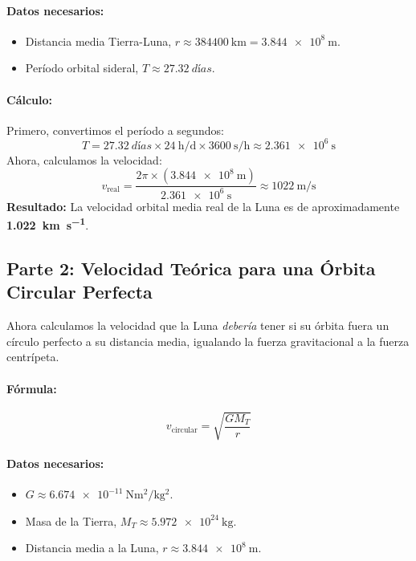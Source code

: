 \documentclass[11pt,a4paper]{book}
\begin{document}
\paragraph{Datos necesarios:}
\begin{itemize}
    \item Distancia media Tierra-Luna, $r \approx \SI{384400}{\kilo\meter} = \SI{3.844e8}{\meter}$.
    \item Período orbital sideral, $T \approx \SI{27.32}{días}$.
\end{itemize}

\paragraph{Cálculo:}
Primero, convertimos el período a segundos:
\[ T = \SI{27.32}{días} \times \SI{24}{\hour\per\day} \times \SI{3600}{\second\per\hour} \approx \SI{2.361e6}{\second} \]
Ahora, calculamos la velocidad:
\[ v_{\text{real}} = \frac{2\pi \times (\SI{3.844e8}{\meter})}{\SI{2.361e6}{\second}} \approx \SI{1022}{\meter\per\second} \]
\textbf{Resultado:} La velocidad orbital media real de la Luna es de aproximadamente \textbf{\SI{1.022}{\kilo\meter\per\second}}.

\subsection*{Parte 2: Velocidad Teórica para una Órbita Circular Perfecta}
Ahora calculamos la velocidad que la Luna \textit{debería} tener si su órbita fuera un círculo perfecto a su distancia media, igualando la fuerza gravitacional a la fuerza centrípeta.

\paragraph{Fórmula:}
\[ v_{\text{circular}} = \sqrt{\frac{G M_T}{r}} \]

\paragraph{Datos necesarios:}
\begin{itemize}
    \item $G \approx \SI{6.674e-11}{\newton\meter\squared\per\kilo\gram\squared}$.
    \item Masa de la Tierra, $M_T \approx \SI{5.972e24}{\kilo\gram}$.
    \item Distancia media a la Luna, $r \approx \SI{3.844e8}{\meter}$.
\end{itemize}
\end{document}
